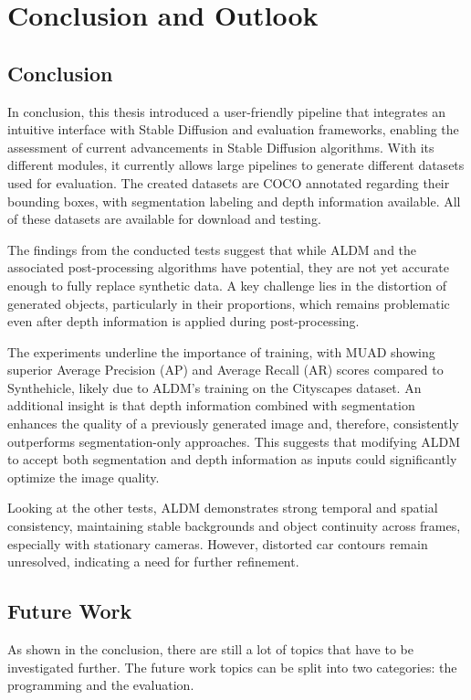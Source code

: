 \chapter{Conclusion and Outlook}
\label{ch:conclusion}
\section{Conclusion}
In conclusion, this thesis introduced a user-friendly pipeline that integrates an intuitive interface with Stable Diffusion and evaluation frameworks, enabling the assessment of current advancements in Stable Diffusion algorithms. With its different modules, it currently allows large pipelines to generate different datasets used for evaluation. The created datasets are COCO annotated regarding their bounding boxes, with segmentation labeling and depth information available. All of these datasets are available for download and testing. 

The findings from the conducted tests suggest that while ALDM and the associated post-processing algorithms have potential, they are not yet accurate enough to fully replace synthetic data. A key challenge lies in the distortion of generated objects, particularly in their proportions, which remains problematic even after depth information is applied during post-processing.

The experiments underline the importance of training, with MUAD showing superior Average Precision (AP) and Average Recall (AR) scores compared to Synthehicle, likely due to ALDM's training on the Cityscapes dataset. An additional insight is that depth information combined with segmentation enhances the quality of a previously generated image and, therefore, consistently outperforms segmentation-only approaches. This suggests that modifying ALDM to accept both segmentation and depth information as inputs could significantly optimize the image quality.

Looking at the other tests, ALDM demonstrates strong temporal and spatial consistency, maintaining stable backgrounds and object continuity across frames, especially with stationary cameras. However, distorted car contours remain unresolved, indicating a need for further refinement.

\section{Future Work}
As shown in the conclusion, there are still a lot of topics that have to be investigated further. The future work topics can be split into two categories: the programming and the evaluation. 

